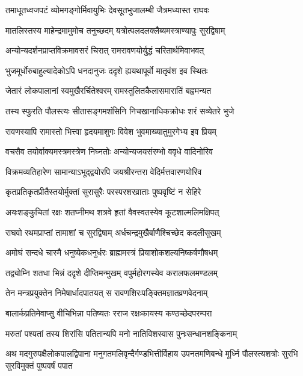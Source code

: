 \twolineshloka
{तमाधूतध्वजपटं व्योमगङ्गोर्मिवायुभिः}
{देवसूतभुजालम्बी जैत्रमध्यास्त राघवः} %

\twolineshloka
{मातलिस्तस्य माहेन्द्रमामुमोच तनुच्छदम्}
{यत्रोत्पलदलक्लैब्यमस्त्राण्यापुः सुरद्विषाम्} %

\twolineshloka
{अन्योन्यदर्शनप्राप्तविक्रमावसरं चिरात्}
{रामरावणयोर्युद्धं चरितार्थमिवाभवत्} %

\twolineshloka
{भुजमूर्धोरुबाहुल्यादेकोऽपि धनदानुजः}
{ददृशे ह्ययथापूर्वो मातृवंश इव स्थितः} %

\twolineshloka
{जेतारं लोकपालानां स्वमुखैरर्चितेश्वरम्}
{रामस्तुलितकैलासमारातिं बह्वमन्यत} %

\twolineshloka
{तस्य स्फुरति पौलस्त्यः सीतासङ्गमशंसिनि}
{निचखानाधिकक्रोधः शरं सव्येतरे भुजे} %

\twolineshloka
{रावणस्यापि रामास्तो भित्त्वा हृदयमाशुगः}
{विवेश भुवमाख्यातुमुरगेभ्य इव प्रियम्} %

\twolineshloka
{वचसैव तयोर्वाक्यमस्त्रमस्त्रेण निघ्नतोः}
{अन्योन्यजयसंरम्भो ववृधे वादिनोरिव} %

\twolineshloka
{विक्रमव्यतिहारेण सामान्याऽभूद्द्वयोरपि}
{जयश्रीरन्तरा वेदिर्मत्तवारणयोरिव} %

\twolineshloka
{कृतप्रतिकृतप्रीतैस्तयोर्मुक्तां सुरासुरैः}
{परस्परशरव्राताः पुष्पवृष्टिं न सेहिरे} %

\twolineshloka
{अयःशङ्कुचितां रक्षः शतघ्नीमथ शत्रवे}
{हृतां वैवस्वतस्येव कूटशाल्मलिमक्षिपत्} %

\twolineshloka
{राघवो रथमप्राप्तां तामाशां च सुरद्विषाम्}
{अर्धचन्द्रमुखैर्बाणैश्चिच्छेद कदलीसुखम्} %

\twolineshloka
{अमोघं सन्दधे चास्मै धनुष्येकधनुर्धरः}
{ब्राह्ममस्त्रं प्रियाशोकशल्यनिष्कर्षणौषधम्} %

\twolineshloka
{तद्व्योम्नि शतधा भिन्नं ददृशे दीप्तिमन्मुखम्}
{वपुर्महोरगस्येव करालफलमण्डलम्} %

\twolineshloka
{तेन मन्त्रप्रयुक्तेन निमेषार्धादपातयत्}
{स रावणशिरःपङ्क्तिमज्ञातव्रणवेदनाम्} %

\twolineshloka
{बालार्कप्रतिमेवाप्सु वीचिभिन्ना पतिष्यतः}
{रराज रक्षःकायस्य कण्ठच्छेदपरम्परा} %

\twolineshloka
{मरुतां पश्यतां तस्य शिरांसि पतितान्यपि}
{मनो नातिविशस्वास पुनःसन्धानशङ्किनाम्} %

\fourlineindentedshloka
{अथ मदगुरुपक्षैलोकपालद्विपाना}
{मनुगतमलिवृन्दैर्गण्डभित्तीर्विहाय}
{उपनतमणिबन्धे मूर्ध्नि पौलस्त्यशत्रोः}
{सुरभि सुरविमुक्तं पुष्पवर्षं पपात} %

